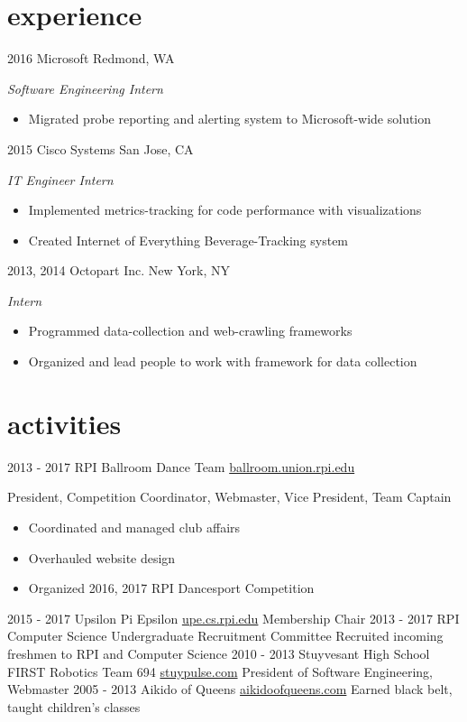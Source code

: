\documentclass[]{friggeri-cv}
\begin{document}
\section{experience}

\begin{entrylist}
  \entry
    {2016}
    {Microsoft}
    {Redmond, WA}
    {\emph{Software Engineering Intern}
    \begin{itemize}
        \item Migrated probe reporting and alerting system to Microsoft-wide solution
    \end{itemize}
    }
  \entry
    {2015}
    {Cisco Systems}
    {San Jose, CA}
    {\emph{IT Engineer Intern}
    \begin{itemize}
        \item Implemented metrics-tracking for code performance with visualizations
        \item Created Internet of Everything Beverage-Tracking system
    \end{itemize}
    }
  \entry
    {2013, 2014}
    {Octopart Inc.}
    {New York, NY}
    {\emph{Intern}
    \begin{itemize}
        \item Programmed data-collection and web-crawling frameworks
        \item Organized and lead people to work with framework for data collection
    \end{itemize}
    }
\end{entrylist}

\section{activities}

\begin{entrylist}
  \entry
    {2013 - 2017}
    {RPI Ballroom Dance Team}
    {\href{http://ballroom.union.rpi.edu}{ballroom.union.rpi.edu}}
    {President, Competition Coordinator, Webmaster, Vice President, Team Captain
    \begin{itemize}
        \item Coordinated and managed club affairs
        \item Overhauled website design
        \item Organized 2016, 2017 RPI Dancesport Competition
    \end{itemize}
    }
  \entry
    {2015 - 2017}
    {Upsilon Pi Epsilon}
    {\href{http://upe.cs.rpi.edu}{upe.cs.rpi.edu}}
    {Membership Chair}
  \entry
    {2013 - 2017}
    {RPI Computer Science Undergraduate Recruitment Committee}
    {}
    {Recruited incoming freshmen to RPI and Computer Science}
  \entry
    {2010 - 2013}
    {Stuyvesant High School FIRST Robotics Team 694}
    {\href{http://stuypulse.com}{stuypulse.com}}
    {President of Software Engineering, Webmaster}
  \entry
    {2005 - 2013}
    {Aikido of Queens}
    {\href{http://aikidoofqueens.com}{aikidoofqueens.com}}
    {Earned black belt, taught children's classes}
\end{entrylist}
\end{document}
